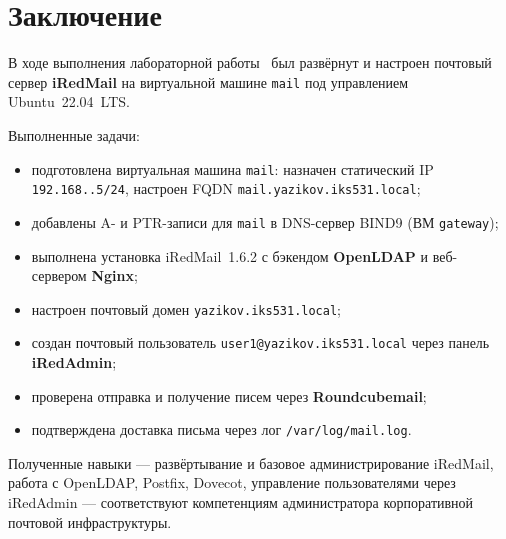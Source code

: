 \chapter*{Заключение}
\label{ch:conclusion}

В ходе выполнения лабораторной работы~\cfgLabNumber{} был развёрнут и настроен
почтовый сервер \textbf{iRedMail} на виртуальной машине \texttt{mail}
под управлением Ubuntu~22.04~LTS.

Выполненные задачи:
\begin{itemize}
  \item подготовлена виртуальная машина \texttt{mail}: назначен статический
        IP \texttt{192.168.\cfgLabStudentN.5/24}, настроен FQDN
        \texttt{mail.yazikov.iks531.local};
  \item добавлены A- и PTR-записи для \texttt{mail} в DNS-сервер BIND9
        (ВМ \texttt{gateway});
  \item выполнена установка iRedMail~1.6.2 с бэкендом \textbf{OpenLDAP}
        и веб-сервером \textbf{Nginx};
  \item настроен почтовый домен \texttt{yazikov.iks531.local};
  \item создан почтовый пользователь \texttt{user1@yazikov.iks531.local}
        через панель \textbf{iRedAdmin};
  \item проверена отправка и получение писем через \textbf{Roundcubemail};
  \item подтверждена доставка письма через лог \texttt{/var/log/mail.log}.
\end{itemize}

Полученные навыки --- развёртывание и базовое администрирование iRedMail,
работа с OpenLDAP, Postfix, Dovecot, управление пользователями через iRedAdmin ---
соответствуют компетенциям администратора корпоративной почтовой инфраструктуры.

\endinput
